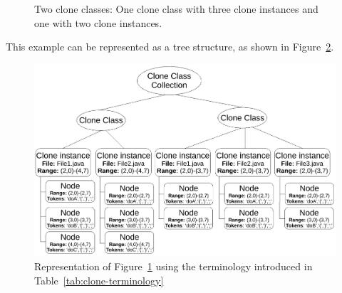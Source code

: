 \begin{figure}[H]
\begin{parcolumns}{3}
\end{parcolumns}
\caption{Two clone classes: One clone class with three clone instances and one with two clone instances.}
\label{fig:cloneclasses}
\end{figure}

This example can be represented as a tree structure, as shown in Figure~\ref{fig:terminologyexample}.

\begin{figure}[H]
  \includegraphics[width=1\columnwidth]{img/TerminologyExample}
  \caption{Representation of Figure~\ref{fig:cloneclasses} using the terminology introduced in Table~\ref{tab:clone-terminology}}
  \label{fig:terminologyexample}
\end{figure}

